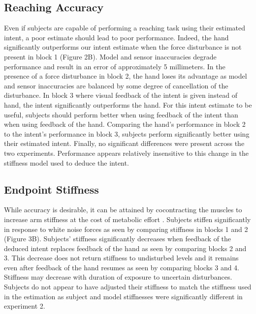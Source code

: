 \documentclass[letterpaper, 10 pt, conference]{ieeeconf}  %
\begin{document}
\subsection*{Reaching Accuracy}
Even if subjects are capable of performing a reaching task using their estimated intent, a poor estimate should lead to poor performance. Indeed, the hand significantly outperforms our intent estimate when the force disturbance is not present in block 1 (Figure 2B). Model and sensor inaccuracies degrade performance and result in an error of approximately 5 millimeters. In the presence of a force disturbance in block 2, the hand loses its advantage as model and sensor inaccuracies are balanced by some degree of cancellation of the disturbance. In block 3 where visual feedback of the intent is given instead of hand, the intent significantly outperforms the hand. For this intent estimate to be useful, subjects should perform better when using feedback of the intent than when using feedback of the hand. Comparing the hand's performance in block 2 to the intent's performance in block 3, subjects perform significantly better using their estimated intent. Finally, no significant differences were present across the two experiments. Performance appears relatively insensitive to this change in the stiffness model used to deduce the intent.

\subsection*{Endpoint Stiffness}
While accuracy is desirable, it can be attained by cocontracting the muscles to increase arm stiffness at the cost of metabolic effort \cite{gribble2003role}\cite{takahashi2001impedance}. Subjects stiffen significantly in response to white noise forces as seen by comparing stiffness in blocks 1 and 2 (Figure 3B). Subjects' stiffness significantly decreases when feedback of the deduced intent replaces feedback of the hand as seen by comparing blocks 2 and 3. This decrease does not return stiffness to undisturbed levels and it remains even after feedback of the hand resumes as seen by comparing blocks 3 and 4. Stiffness may decrease with duration of exposure to uncertain disturbances\cite{takahashi2001impedance}. Subjects do not appear to have adjusted their stiffness to match the stiffness used in the estimation as subject and model stiffnesses were significantly different in experiment 2.
\end{document}
